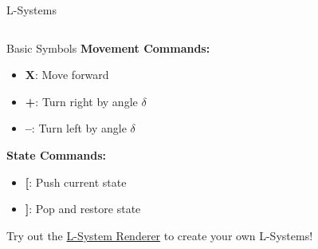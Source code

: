 \begin{frame}{L-Systems}
  \begin{columns}
    \small
    \begin{column}{0.5\textwidth}
      \begin{raybox}{Basic Symbols}
        \textbf{Movement Commands:}
        \begin{itemize}
          \item \textbf{X}: Move forward
          \item \textbf{+}: Turn right by angle $\delta$
          \item \textbf{--}: Turn left by angle $\delta$
        \end{itemize}

        \textbf{State Commands:}
        \begin{itemize}
          \item \textbf{[}: Push current state
          \item \textbf{]}: Pop and restore state
        \end{itemize}
      \end{raybox}
      Try out the \href{https://piratefsh.github.io/p5js-art/public/lsystems/}{\textcolor{AccentColor}{L-System Renderer}} to create your own L-Systems!
    \end{column}

    \begin{column}{0.5\textwidth}
\end{column}
\end{columns}
\end{frame}
